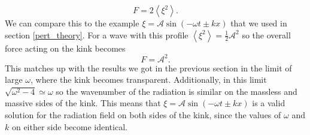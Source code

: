 \documentclass[11pt, oneside,titlepage]{article}  	%
\numberwithin{equation}{section}
\begin{document}
\begin{equation}
F = 2\left \langle \xi^2 \right \rangle.
\end{equation}
We can compare this to the example $\xi = \mathcal{A}\sin( - \omega t \pm k x)$ that we used in section \ref{pert_theory}. For a wave with this profile $ \left \langle \xi^2 \right \rangle = \frac{1}{2}\mathcal{A}^2$ so the overall force acting on the kink becomes
\begin{equation}
F = \mathcal{A}^2.
\end{equation}
This matches up with the results we got in the previous section in the limit of large $\omega$, where the kink becomes transparent. Additionally, in this limit $\sqrt{\omega^2 - 4} \simeq \omega$ so the wavenumber of the radiation is similar on the massless and massive sides of the kink. This means that $\xi = \mathcal{A}\sin( - \omega t \pm k x)$ is a valid solution for the radiation field on both sides of the kink, since the values of $\omega$ and $k$ on either side become identical.
\end{document}
